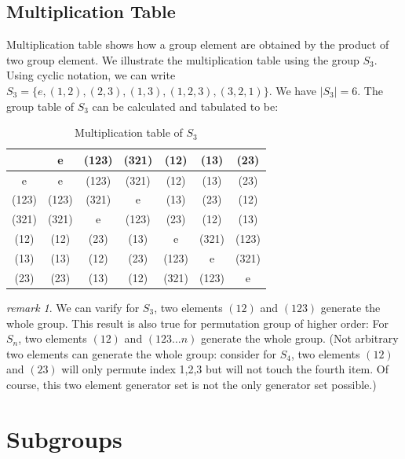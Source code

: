 \documentclass{amsart}
\theoremstyle{remark}
\newtheorem*{remark}{remark}
\theoremstyle{remark}
\theoremstyle{definition}
\begin{document}
\subsection*{Multiplication Table}
Multiplication table shows how a group element are obtained by the product of two group element. We illustrate the multiplication 
table using the group $S_3$.
Using cyclic notation, we can write $S_3 = \{ e, (1,2), (2,3), (1,3), (1,2,3), (3,2,1) \}$. We have $|S_3| = 6$. The group table of $S_3$ can be calculated 
and tabulated to be:
\begin{table}[h]
    \centering
    \caption{Multiplication table of $S_3$}
    \begin{tabular}{|c|ccc|ccc|}
        \hline
                & e     & (123) & (321) & (12)  & (13)  & (23)  \\ \hline
           e    & e     & (123) & (321) & (12)  & (13)  & (23)  \\ 
          (123) & (123) & (321) & e     & (13)  & (23)  & (12)  \\
          (321) & (321) & e     & (123) & (23)  & (12)  & (13)  \\ \hline
          (12)  & (12)  & (23)  & (13)  &     e & (321) & (123) \\
          (13)  & (13)  & (12)  & (23)  & (123) & e     & (321) \\
          (23)  & (23)  & (13)  & (12)  & (321) & (123) & e     \\ \hline
    \end{tabular}
    \label{T:s3}
\end{table}

\begin{remark}
    We can varify for $S_3$, two elements $(12)$ and $(123)$ generate the whole group. 
    This result is also true for permutation group of higher order: For $S_n$, two elements
    $(12)$ and $(123\dots n)$ generate the whole group.
    (Not arbitrary two elements can generate the whole group: consider for $S_4$, two elements $(12)$ and $(23)$ will
    only permute index 1,2,3 but will not touch the fourth item. Of course, this two element generator set is not 
    the only generator set possible.)
\end{remark}

\vspace{10pt}
\section*{Subgroups}
\end{document}
